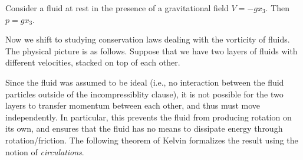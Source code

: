 \documentclass{article}
\begin{document}
\begin{corollary}[Stevino]
	Consider a fluid at rest in the presence of a gravitational field $V = -gx_{3}$. Then $p = gx_{3}$. 
\end{corollary} 

Now we shift to studying conservation laws dealing with the vorticity of fluids. The physical picture is as follows. Suppose that we have two layers of fluids with different velocities, stacked on top of each other. 
\begin{figure}[h!]
\centering  
\end{figure}

Since the fluid was assumed to be ideal (i.e., no interaction between the fluid particles outside of the incompressiblity clause), it is not possible for the two layers to transfer momentum between each other, and thus must move independently. In particular, this prevents the fluid from producing rotation on its own, and ensures that the fluid has no means to dissipate energy through rotation/friction. The following theorem of Kelvin formalizes the result using the notion of \textit{circulations}. 
\end{document}
